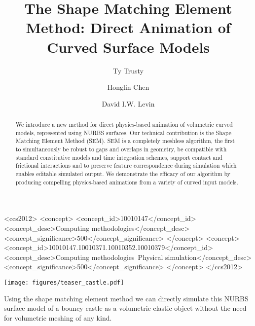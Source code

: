 \documentclass[acmtog, anonymous=false, review=false, balance=false]{acmart}
\begin{document}
\title{The Shape Matching Element Method: Direct Animation of Curved Surface Models}

\author{Ty Trusty}
%
\author{Honglin Chen}
%
%
\author{David I.W. Levin}

\begin{CCSXML}
<ccs2012>
   <concept>
       <concept_id>10010147</concept_id>
       <concept_desc>Computing methodologies</concept_desc>
       <concept_significance>500</concept_significance>
       </concept>
   <concept>
       <concept_id>10010147.10010371.10010352.10010379</concept_id>
       <concept_desc>Computing methodologies~Physical simulation</concept_desc>
       <concept_significance>500</concept_significance>
       </concept>
 </ccs2012>
\end{CCSXML}


%
%




\begin{teaserfigure}
  \texttt{[image: figures/teaser\_castle.pdf]}
  \caption{Using the shape matching element method we can directly simulate this NURBS surface model of a bouncy castle as a volumetric elastic object without the need for volumetric meshing of any kind.}
  \label{fig:teaser}
\end{teaserfigure}

\begin{abstract}
We introduce a new method for direct physics-based animation of volumetric curved models, represented using NURBS surfaces.  
Our technical contribution is the Shape Matching Element Method (SEM).
SEM is a completely meshless algorithm, the first to simultaneously 
be robust to gaps and overlaps in geometry, 
be compatible with standard constitutive models and time integration schemes, support contact and frictional interactions  
and to preserve feature correspondence during simulation which enables editable simulated output. 
We demonstrate the efficacy of our algorithm by producing compelling physics-based animations from a variety of curved input models.
\end{abstract}
\end{document}
